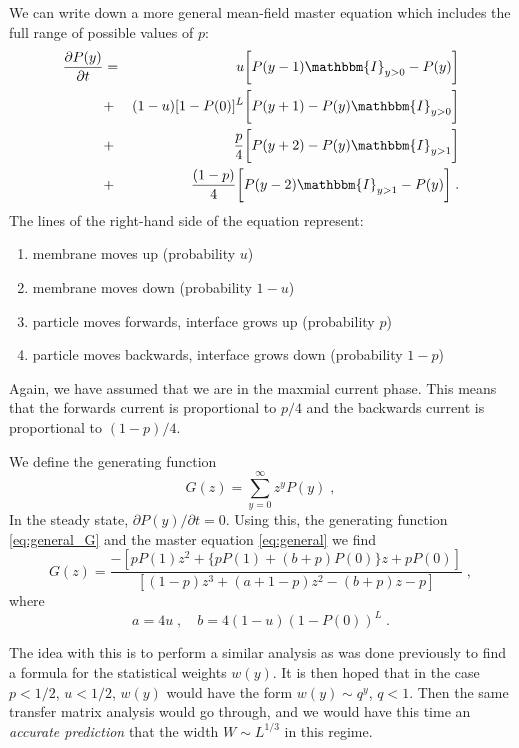 \documentclass[a4paper,10pt]{article}
\newcommand{\I}{\mathbbm{I}}
\newcommand{\pzero}{P(0)}
\begin{document}
We can write down a more general mean-field master equation which includes the full range of possible values of $p$:
\begin{eqnarray}\label{eq:general}
  \frac{\partial P(y)}{\partial t} & = & u \bigg[ P(y-1) \I_{y>0} - P(y) \bigg] \nonumber \\
				   & + & (1-u)[1-\pzero]^L \bigg[ P(y+1)  - P(y) \I_{y>0} \bigg] \nonumber \\
				   & + & \frac{p}{4} \bigg[ P(y+2) - P(y) \I_{y>1} \bigg] \nonumber \\
				   & + & \frac{(1-p)}{4} \bigg[ P(y-2) \I_{y>1} - P(y) \bigg] \;.
\end{eqnarray}
The lines of the right-hand side of the equation represent:
\begin{enumerate}
 \item membrane moves up (probability $u$)
 \item membrane moves down (probability $1-u$)
 \item particle moves forwards, interface grows up (probability $p$)
 \item particle moves backwards, interface grows down (probability $1-p$)
\end{enumerate}
Again, we have assumed that we are in the maxmial current phase. This means that the forwards current is proportional to $p/4$ and the backwards current is proportional to $(1-p)/4$.

We define the generating function
\begin{equation}\label{eq:general_G}
 G(z) = \sum_{y=0}^{\infty}z^y P(y) \;,
\end{equation}
In the steady state, $\partial P(y)/\partial t = 0$. Using this, the generating function \eqref{eq:general_G} and the master equation \eqref{eq:general} we find
\begin{equation}
  G(z) = \frac{ - \left[ pP(1) z^2 + \{ pP(1) + (b+p)P(0) \}z + pP(0) \right] }{ \left[ (1-p)z^3 + (a + 1 - p)z^2 - (b+p) z - p \right] } \;,
\end{equation}
where
\begin{equation}\label{eq:ab_defn}
  a = 4u \;, \quad b = 4(1-u)(1-P(0))^L \;.
\end{equation}

The idea with this is to perform a similar analysis as was done previously to find a formula for the statistical weights $w(y)$. It is then hoped that in the case $p<1/2$, $u< 1/2$, $w(y)$ would have the form $w(y) \sim q^y$, $q < 1$. Then the same transfer matrix analysis would go through, and we would have this time an \emph{accurate prediction} that the width $W \sim L^{1/3}$ in this regime. 
\end{document}
